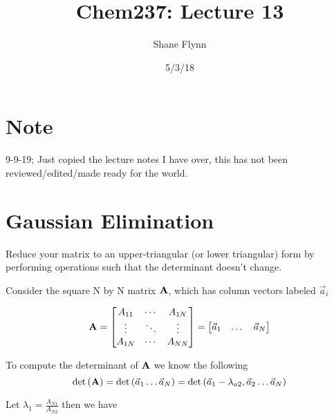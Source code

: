 \documentclass{article}
\title{Chem237: Lecture 13}
\date{5/3/18}
\author{Shane Flynn}
\newcommand{\be}{\begin{equation}}
\newcommand{\ee}{\end{equation}}
\newcommand{\bA}{\mbox{\bf A}}
\begin{document}
\maketitle

\section{Note}
9-9-19; Just copied the lecture notes I have over, this has not been reviewed/edited/made ready for the world. 

\section*{Gaussian Elimination}
Reduce your matrix to an upper-triangular (or lower triangular) form by performing operations such that the determinant doesn't change. 

Consider the square N by N matrix $\bA$, which has column vectors labeled $\vec{a}_i$

\be
\bA =  
\begin{bmatrix}
    A_{11}  & \dotsb &  A_{1N} \\
    \vdots  & \ddots &  \vdots \\
    A_{1N}  & \dotsb &  A_{NN} 
\end{bmatrix}
    = 
\begin{bmatrix}
        \vec{a}_1 & \dots  & \vec{a}_N 
\end{bmatrix}
\ee

To compute the determinant of $\bA$ we know the following
\be
\be \det\left(\bA\right) = \det\left(\vec{a}_1 \dots  \vec{a}_N \right) = \det\left(\vec{a}_1- \lambda_{a2}, \vec{a}_2 \dots  \vec{a}_N \right) 
\ee

Let $\lambda_1 = \frac{A_{N1}}{A_{N2}}$ then we have
\end{document}
